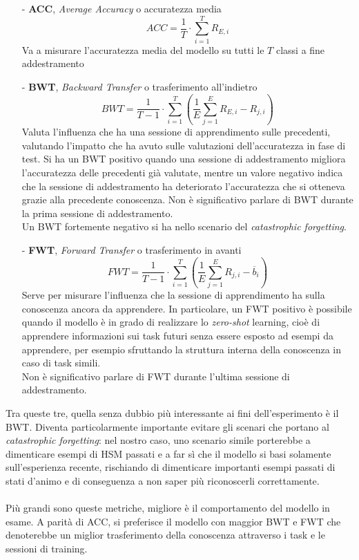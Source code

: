 \begin{itemize}
    \item[-] \textbf{ACC}, \textit{Average Accuracy} o accuratezza media
        \begin{equation}\label{eq:fun_acc}
            ACC = \frac{1}{T}\cdot\sum_{i=1}^T R_{E,i}
        \end{equation}
    Va a misurare l'accuratezza media del modello su tutti le $T$ classi a fine addestramento
    \item[-] \textbf{BWT}, \textit{Backward Transfer} o trasferimento all'indietro
        \begin{equation}\label{eq:fun_bwt}
            BWT = \frac{1}{T-1}\cdot\sum_{i=1}^T\left(\frac{1}{E}\sum_{j=1}^E R_{E,i} - R_{j,i}\right)
        \end{equation}
    Valuta l'influenza che ha una sessione di apprendimento sulle precedenti, valutando l'impatto che ha avuto sulle valutazioni dell'accuratezza in fase di test. Si ha un BWT positivo quando una sessione di addestramento migliora l'accuratezza delle precedenti già valutate, mentre un valore negativo indica che la sessione di addestramento ha deteriorato l'accuratezza che si otteneva grazie alla precedente conoscenza. Non è significativo parlare di BWT durante la prima sessione di addestramento.\\
    Un BWT fortemente negativo si ha nello scenario del \textit{catastrophic forgetting}.
    \pagebreak
    \item[-] \textbf{FWT}, \textit{Forward Transfer} o trasferimento in avanti
        \begin{equation}\label{eq:fun_fwt}
            FWT = \frac{1}{T-1}\cdot\sum_{i=1}^T\left(\frac{1}{E}\sum_{j=1}^E R_{j,i} - \overline{b}_i\right)
        \end{equation}
    Serve per misurare l'influenza che la sessione di apprendimento ha sulla conoscenza ancora da apprendere. In particolare, un FWT positivo è possibile quando il modello è in grado di realizzare lo \textit{zero-shot} learning, cioè di apprendere informazioni sui task futuri senza essere esposto ad esempi da apprendere, per esempio sfruttando la struttura interna della conoscenza in caso di task simili.\\
    Non è significativo parlare di FWT durante l'ultima sessione di addestramento.
\end{itemize}
Tra queste tre, quella senza dubbio più interessante ai fini dell'esperimento è il BWT. Diventa particolarmente importante evitare gli scenari che portano al \textit{catastrophic forgetting}: nel nostro caso, uno scenario simile porterebbe a dimenticare esempi di HSM passati e a far sì che il modello si basi solamente sull'esperienza recente, rischiando di dimenticare importanti esempi passati di stati d'animo e di conseguenza a non saper più riconoscerli correttamente.\\\\
Più grandi sono queste metriche, migliore è il comportamento del modello in esame. A parità di ACC, si preferisce il modello con maggior BWT e FWT che denoterebbe un miglior trasferimento della conoscenza attraverso i task e le sessioni di training.
